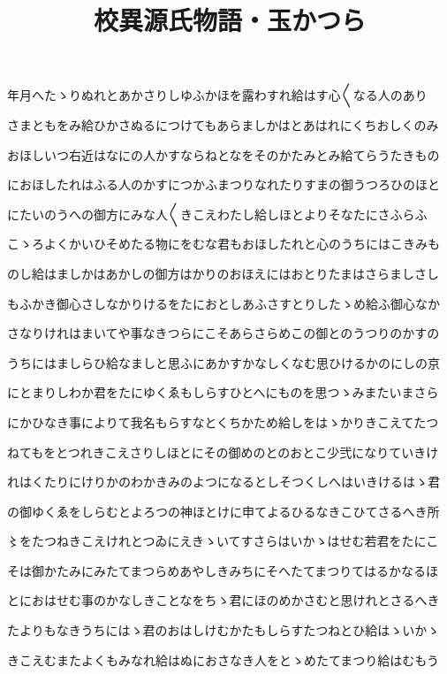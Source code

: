 \documentclass[a4paper,11pt,landscape]{ltjtarticle}
\title{校異源氏物語・玉かつら}
\date{}
\begin{document}
\maketitle

年月へたゝりぬれとあかさりしゆふかほを露わすれ給はす心〱なる人のあり
\par\medskip
さまともをみ給ひかさぬるにつけてもあらましかはとあはれにくちおしくのみ
\par\medskip
おほしいつ右近はなにの人かすならねとなをそのかたみとみ給てらうたきもの
\par\medskip
におほしたれはふる人のかすにつかふまつりなれたりすまの御うつろひのほと
\par\medskip
にたいのうへの御方にみな人〱きこえわたし給しほとよりそなたにさふらふ
\par\medskip
こゝろよくかいひそめたる物にをむな君もおほしたれと心のうちにはこきみも
\par\medskip
のし給はましかはあかしの御方はかりのおほえにはおとりたまはさらましさし
\par\medskip
もふかき御心さしなかりけるをたにおとしあふさすとりしたゝめ給ふ御心なか
\par\medskip
さなりけれはまいてや事なきつらにこそあらさらめこの御とのうつりのかすの
\par\medskip
うちにはましらひ給なましと思ふにあかすかなしくなむ思ひけるかのにしの京
\par\medskip
にとまりしわか君をたにゆくゑもしらすひとへにものを思つゝみまたいまさら
\par\medskip
にかひなき事によりて我名もらすなとくちかため給しをはゝかりきこえてたつ
\par\medskip
ねてもをとつれきこえさりしほとにその御めのとのおとこ少弐になりていきけ
\par\medskip
れはくたりにけりかのわかきみのよつになるとしそつくしへはいきけるはゝ君
\par\medskip
の御ゆくゑをしらむとよろつの神ほとけに申てよるひるなきこひてさるへき所
\par\medskip
〻をたつねきこえけれとつゐにえきゝいてすさらはいかゝはせむ若君をたにこ
\par\medskip
そは御かたみにみたてまつらめあやしきみちにそへたてまつりてはるかなるほ
\par\medskip
とにおはせむ事のかなしきことなをちゝ君にほのめかさむと思けれとさるへき
\par\medskip
たよりもなきうちにはゝ君のおはしけむかたもしらすたつねとひ給はゝいかゝ
\par\medskip
きこえむまたよくもみなれ給はぬにおさなき人をとゝめたてまつり給はむもう
\end{document}
